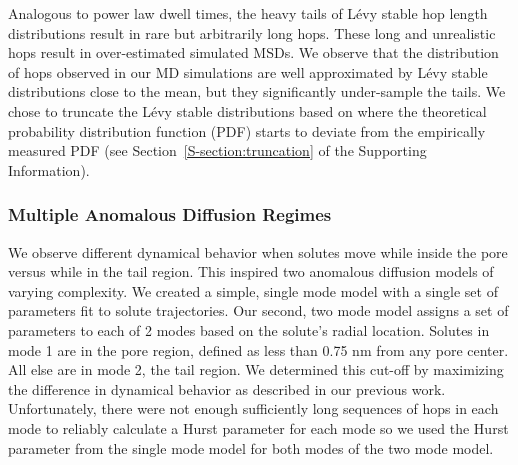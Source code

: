\documentclass{article}
\begin{document}
  Analogous to power law dwell times, the heavy tails of L\'evy stable 
  hop length distributions result in rare but arbitrarily long hops. These long
  and unrealistic hops result in over-estimated simulated MSDs. We observe that
  the distribution of hops observed in our MD simulations are well approximated 
  by L\'evy stable distributions close to the mean, but they significantly under-sample
  the tails. We chose to truncate the L\'evy stable distributions based
  on where the theoretical probability distribution function (PDF) starts to 
  deviate from the empirically measured PDF (see Section~\ref{S-section:truncation}
  of the Supporting Information).
  

  \subsubsection*{Multiple Anomalous Diffusion Regimes}
  
  We observe different dynamical behavior when solutes move while inside 
  the pore versus while in the tail region. This inspired two anomalous diffusion 
  models of varying complexity. We created a simple, single mode model with a single 
  set of parameters fit to solute trajectories.
  Our second, two mode model assigns a set of parameters to each of 2 modes based
  on the solute's radial location. Solutes in mode 1 are in the pore region, defined
  as less than 0.75 nm from any pore center. All else are in mode 2, the tail region. 
  We determined this cut-off by maximizing the difference in dynamical behavior as 
  described in our previous work.~\cite{coscia_chemically_2019} Unfortunately, 
  there were not enough sufficiently long sequences of hops in each mode to reliably
  calculate a Hurst parameter for each mode so we used the Hurst parameter from the 
  single mode model for both modes of the two mode model.
  
 
\end{document}
